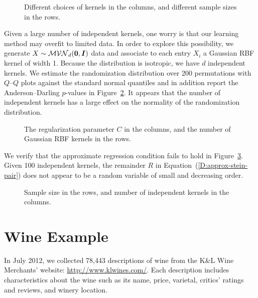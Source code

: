 \begin{figure}
  \begin{center}
    \resizebox{14.0cm}{!}{
      
    }
  \end{center}
\caption{Different choices of kernels in the columns, and different
  sample sizes in the rows.}
\label{fig:mkl_arc}
\end{figure}

Given a large number of independent kernels, one worry is that our
learning method may overfit to limited data.  In order to explore this
possibility, we generate $X \sim \mathcal{MVN}_d({\bf 0}, {\boldsymbol I})$
data and associate to each entry $X_i$ a Gaussian RBF kernel of width
1.  Because the distribution is isotropic, we have $d$ independent
kernels.  We estimate the randomization distribution over 200
permutations with $Q$--$Q$ plots against the standard normal quantiles
and in addition report the Anderson--Darling $p$-values
in Figure~\ref{fig:overfit_mkl}.  It appears that the number of
independent kernels has a large effect on the normality of the
randomization distribution.

\begin{figure}
  \begin{center}
    \resizebox{14.0cm}{!}{
      
    }
  \end{center}
\caption{The regularization parameter $C$ in the columns, and the
  number of Gaussian RBF kernels in the rows.}
\label{fig:overfit_mkl}
\end{figure}

We verify that the approximate regression condition fails to hold in
Figure~\ref{fig:mkl_arc_overfit}.  Given 100 independent kernels, the
remainder $R$ in Equation~(\ref{D:approx-stein-pair}) does not
appear to be a random variable of small and decreasing order.

\begin{figure}
  \begin{center}
    \resizebox{14.0cm}{!}{
      
    }
  \end{center}
\caption{Sample size in the rows, and number of independent kernels in
the columns.}
\label{fig:mkl_arc_overfit}
\end{figure}

\section{Wine Example}
In July 2012, we collected 78,443 descriptions of wine from the K\&L
Wine Merchants' website: \url{http://www.klwines.com/}.  Each
description includes characteristics about the wine such as its name,
price, varietal, critics' ratings and reviews, and winery location.

